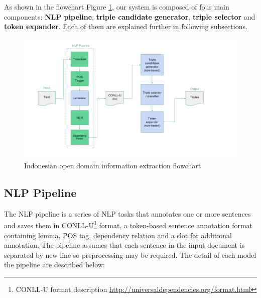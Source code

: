 \documentclass[conference,compsoc,12pt]{IEEEtran}
\begin{document}
As shown in the flowchart Figure \ref{fig_program_flowchart}, our system is composed of four main components: \textbf{NLP pipeline}, \textbf{triple candidate generator}, \textbf{triple selector} and \textbf{token expander}. Each of them are explained further in following subsections.

\begin{figure}
\centering
\includegraphics[width=\textwidth]{../images/program_flowchart.png}
\caption{Indonesian open domain information extraction flowchart}
\label{fig_program_flowchart}
\end{figure}

\subsection{NLP Pipeline}

The NLP pipeline is a series of NLP tasks that annotates one or more sentences and saves them in CONLL-U\footnote{CONLL-U format description \url{http://universaldependencies.org/format.html}} format, a token-based sentence annotation format containing lemma, POS tag, dependency relation and a slot for additional annotation. The pipeline assumes that each sentence in the input document is separated by new line so preprocessing may be required. The detail of each model the pipeline are described below:
\end{document}

